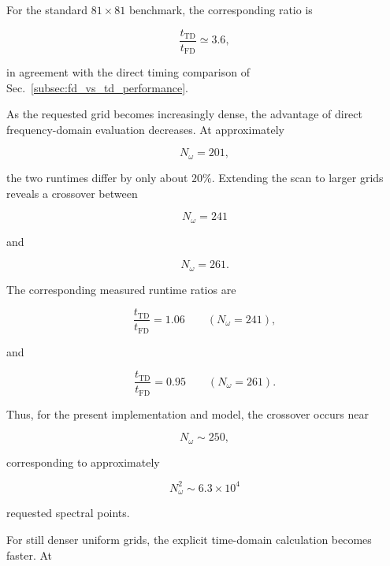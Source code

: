 \documentclass[11pt]{article}
\begin{document}
For the standard $81\times81$ benchmark, the corresponding ratio is

\begin{equation}
\frac{t_{\mathrm{TD}}}{t_{\mathrm{FD}}}
\simeq
3.6,
\end{equation}

in agreement with the direct timing comparison of
Sec.~\ref{subsec:fd_vs_td_performance}.

As the requested grid becomes increasingly dense, the advantage of
direct frequency-domain evaluation decreases.  At approximately

\begin{equation}
N_\omega=201,
\end{equation}

the two runtimes differ by only about $20\%$.  Extending the scan to
larger grids reveals a crossover between

\begin{equation}
N_\omega=241
\end{equation}

and

\begin{equation}
N_\omega=261.
\end{equation}

The corresponding measured runtime ratios are

\begin{equation}
\frac{t_{\mathrm{TD}}}{t_{\mathrm{FD}}}
=
1.06
\qquad
(N_\omega=241),
\end{equation}

and

\begin{equation}
\frac{t_{\mathrm{TD}}}{t_{\mathrm{FD}}}
=
0.95
\qquad
(N_\omega=261).
\end{equation}

Thus, for the present implementation and model, the crossover occurs
near

\begin{equation}
\boxed{
N_\omega
\sim
250,
}
\end{equation}

corresponding to approximately

\begin{equation}
N_\omega^2
\sim
6.3\times10^4
\end{equation}

requested spectral points.

For still denser uniform grids, the explicit time-domain calculation
becomes faster.  At
\end{document}
